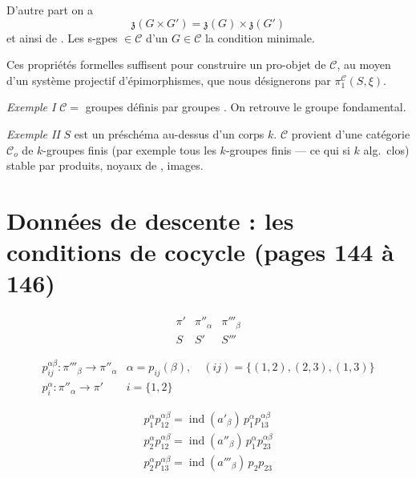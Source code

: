 \documentclass[11pt,a4paper]{article}
\begin{document}


D'autre part on a
\[
\mathfrak{z}(G \times G') = \mathfrak{z}(G) \times \mathfrak{z}(G')
\]
et ainsi de . Les s-gpes $\in \mathcal{C}$ d'un
$G \in \mathcal{C}$  la condition minimale.

Ces propriétés formelles suffisent pour
construire un pro-objet de $\mathcal{C}$, au
moyen d'un système projectif d'épimorphismes, que nous \struck{\ill{}} désignerons
par $\pi_1^{\mathcal{C}}(S, \xi)$.

\emph{Exemple I} $\mathcal{C} = $  groupes
définis par  groupes . On retrouve le
groupe fondamental.

\emph{Exemple II} $S$ est un préschéma au-dessus
d'un corps $k$. $\mathcal{C}$ provient d'une catégorie $\mathcal{C}_o$ de $k$-groupes finis (par
exemple tous les $k$-groupes finis — ce qui  \struck{\ill{}}  si $k$ alg.\ clos)
stable par produits, noyaux de , images.

\section*{Données de descente : les conditions de cocycle (pages 144 à 146)}


\[
\begin{array}{ccc}
\pi' & \pi''_{\alpha} & \pi'''_{\beta} \\
S & S' & S'''
\end{array}
\]

\[
\begin{array}{ll}
p_{ij}^{\alpha\beta} : \pi'''_{\beta} \to \pi''_{\alpha} & \alpha = p_{ij}(\beta), \quad (ij) = \{(1,2), (2,3), (1,3)\} \\
p_i^{\alpha} : \pi''_{\alpha} \to \pi' & i = \{1, 2\}
\end{array}
\]


\[
\begin{array}{l}
p_1^{\alpha} p_{12}^{\alpha\beta} = \operatorname{ind}(a'_{\beta})\, p_1^{\alpha} p_{13}^{\alpha\beta} \\
p_2^{\alpha} p_{12}^{\alpha\beta} = \operatorname{ind}(a''_{\beta})\, p_1^{\alpha} p_{23}^{\alpha\beta} \\
p_2^{\alpha} p_{13}^{\alpha\beta} = \operatorname{ind}(a'''_{\beta})\, p_2 p_{23}
\end{array}
\]
\end{document}

